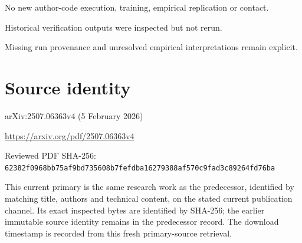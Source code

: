 \documentclass[11pt]{article}
\begin{document}
No new author-code execution, training, empirical replication or contact.\par

Historical verification outputs were inspected but not rerun.\par

Missing run provenance and unresolved empirical interpretations remain explicit.\par

\section*{Source identity}

arXiv:2507.06363v4 (5 February 2026)

\url{https://arxiv.org/pdf/2507.06363v4}

Reviewed PDF SHA-256: \nolinkurl{62382f0968bb75af9bd735608b7fefdba16279388af570c9fad3c89264fd76ba}

This current primary is the same research work as the predecessor, identified by matching title, authors and technical content, on the stated current publication channel. Its exact inspected bytes are identified by SHA-256; the earlier immutable source identity remains in the predecessor record. The download timestamp is recorded from this fresh primary-source retrieval.
\end{document}
